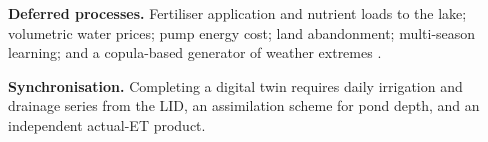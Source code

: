 \documentclass[11pt]{article}
\begin{document}
\textbf{Deferred processes.} Fertiliser application and nutrient loads to the lake; volumetric water prices; pump energy cost; land abandonment; multi-season learning; and a copula-based generator of weather extremes \citep{Claassen2025}.

\textbf{Synchronisation.} Completing a digital twin requires daily irrigation and drainage series from the LID, an assimilation scheme for pond depth, and an independent actual-ET product.



\end{document}
